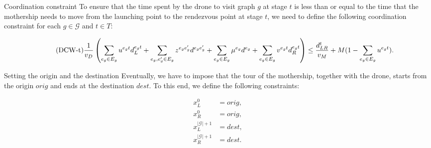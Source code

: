 \documentclass[slidestop,usepdftitle=false,10pt]{beamer}
\begin{document}
	\begin{frame}{Coordination constraint}
	    To ensure that the time spent by the drone to visit graph $g$ at stage $t$ is less than or equal to the time that the mothership needs to move from the launching point to the rendezvous point at stage $t$, we need to define the following coordination constraint for each $g\in \mathcal G$ and $t\in T$:

        \begin{equation}\tag{DCW-t}\label{DCW-t}
        \tiny
        \frac{1}{v_D}\left(\sum_{e_g\in E_g} u^{e_gt}d_L^{e_gt} + \sum_{e_g, e^\prime_g\in E_g}z^{e_ge^\prime_g}d^{e_ge^\prime_g} + \sum_{e_g\in E_g} \mu^{e_g}d^{e_g} + \sum_{e_g\in E_g} v^{e_gt}d_R^{e_gt}\right) \leq \frac{d_{LR}^t}{v_M} + M(1 - \sum_{e_g\in E_g} u^{e_gt}).
        \end{equation}
	\end{frame}
	
	\begin{frame}{Setting the origin and the destination}
	    Eventually, we have to impose that the tour of the mothership, together with the drone, starts from the origin $orig$ and ends at the destination $dest$. To this end, we define the following constraints:

        \begin{align*}
        x_L^0 & =  orig,  \tag{ORIG$_1$} \label{eq:O1} \\
        x_R^0 & =  orig,  \tag{ORIG$_2$} \label{eq:O2} \\
        x_L^{|\mathcal{G}|+1} & =  dest,  \tag{DEST$_1$} \label{eq:D1} \\
        x_R^{|\mathcal{G}|+1} & =  dest.  \tag{DEST$_2$} \label{eq:D2} 
        \end{align*}

	\end{frame}
	
\end{document}
